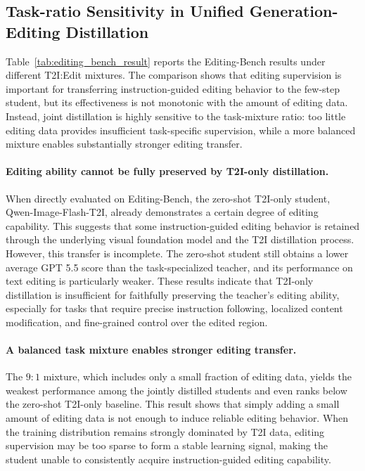 \documentclass{article}
\begin{document}
\subsection{Task-ratio Sensitivity in Unified Generation-Editing Distillation}


Table~\ref{tab:editing_bench_result} reports the Editing-Bench results under different T2I:Edit mixtures. The comparison shows that editing supervision is important for transferring instruction-guided editing behavior to the few-step student, but its effectiveness is not monotonic with the amount of editing data. Instead, joint distillation is highly sensitive to the task-mixture ratio: too little editing data provides insufficient task-specific supervision, while a more balanced mixture enables substantially stronger editing transfer.

\paragraph{Editing ability cannot be fully preserved by T2I-only distillation.}
When directly evaluated on Editing-Bench, the zero-shot T2I-only student, Qwen-Image-Flash-T2I, already demonstrates a certain degree of editing capability. This suggests that some instruction-guided editing behavior is retained through the underlying visual foundation model and the T2I distillation process. However, this transfer is incomplete. The zero-shot student still obtains a lower average GPT 5.5 score than the task-specialized teacher, and its performance on text editing is particularly weaker. These results indicate that T2I-only distillation is insufficient for faithfully preserving the teacher's editing ability, especially for tasks that require precise instruction following, localized content modification, and fine-grained control over the edited region.

\paragraph{A balanced task mixture enables stronger editing transfer.}
The $9{:}1$ mixture, which includes only a small fraction of editing data, yields the weakest performance among the jointly distilled students and even ranks below the zero-shot T2I-only baseline. This result shows that simply adding a small amount of editing data is not enough to induce reliable editing behavior. When the training distribution remains strongly dominated by T2I data, editing supervision may be too sparse to form a stable learning signal, making the student unable to consistently acquire instruction-guided editing capability.
\end{document}
